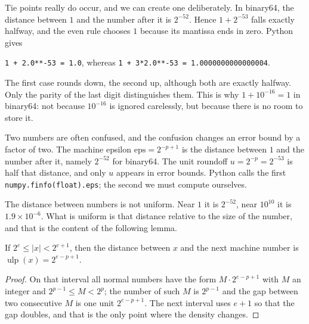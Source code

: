 Tie points really do occur, and we can create one deliberately. In
binary64, the distance between $1$ and the number after it is $2^{-52}$. Hence
$1+2^{-53}$ falls exactly halfway, and the even rule chooses $1$ because its mantissa
ends in zero. Python gives

\begin{center}
\texttt{1 + 2.0**-53 = 1.0}, whereas \texttt{1 + 3*2.0**-53 = 1.0000000000000004}.
\end{center}

The first case rounds down, the second up, although both are exactly halfway. Only the
parity of the last digit distinguishes them. This is why
$1+10^{-16}=1$ in binary64: not because $10^{-16}$ is ignored carelessly,
but because there is no room to store it.


Two numbers are often confused, and the confusion changes an error bound by a factor of
two. The machine epsilon $\mathrm{eps}=2^{-p+1}$ is the distance between $1$ and the
number after it, namely $2^{-52}$ for binary64. The unit roundoff
$u=2^{-p}=2^{-53}$ is half that distance, and only $u$ appears in error
bounds. Python calls the first \texttt{numpy.finfo(float).eps}; the second we must
compute ourselves.

The distance between numbers is not uniform. Near $1$ it is $2^{-52}$, near
$10^{10}$ it is $1.9\times10^{-6}$. What is uniform is that distance relative
to the size of the number, and that is the content of the following lemma.

\begin{lemma}[Ulp]
If $2^{e}\le|x|<2^{e+1}$, then the distance between $x$ and the next machine number is
$\operatorname{ulp}(x)=2^{e-p+1}$.
\end{lemma}

\begin{proof}
On that interval all normal numbers have the form $M\cdot2^{e-p+1}$ with $M$ an integer
and $2^{p-1}\le M<2^{p}$; the number of such $M$ is $2^{p-1}$ and the gap between two
consecutive $M$ is one unit $2^{e-p+1}$. The next interval uses $e+1$ so that the gap
doubles, and that is the only point where the density changes.
\end{proof}


